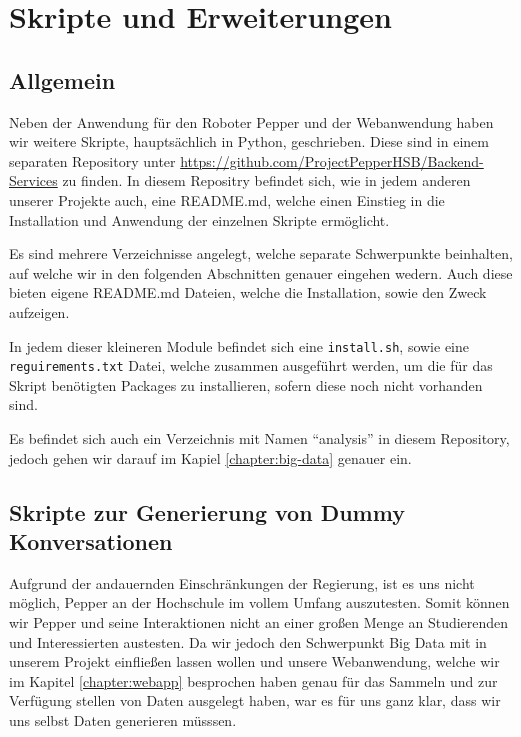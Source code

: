 \newcommand{\scripts}{Kapitel 6.}

\chapter{Skripte und Erweiterungen}
\label{chapter:scripts}
\lhead{\scripts \emph{Skripte und Erweiterungen}}

\section{Allgemein}
Neben der Anwendung für den Roboter Pepper und der Webanwendung haben wir weitere Skripte,
hauptsächlich in Python, geschrieben. Diese sind in einem separaten Repository unter
\href{https://github.com/ProjectPepperHSB/Backend-Services}{https://github.com/ProjectPepperHSB/Backend-Services}
zu finden. In diesem Repositry befindet sich, wie in jedem anderen unserer Projekte auch, eine README.md, welche
einen Einstieg in die Installation und Anwendung der einzelnen Skripte ermöglicht.

Es sind mehrere Verzeichnisse angelegt, welche separate Schwerpunkte beinhalten, auf welche wir in den folgenden
Abschnitten genauer eingehen wedern. Auch diese bieten eigene README.md Dateien, welche die Installation, sowie den Zweck aufzeigen.

In jedem dieser kleineren Module befindet sich eine \verb|install.sh|, sowie eine \verb|reguirements.txt| Datei, welche
zusammen ausgeführt werden, um die für das Skript benötigten Packages zu installieren, sofern diese noch nicht vorhanden sind.

Es befindet sich auch ein Verzeichnis mit Namen ``analysis'' in diesem Repository, jedoch gehen wir
darauf im Kapiel \ref{chapter:big-data} genauer ein.

\section{Skripte zur Generierung von Dummy Konversationen}
\label{sec:dummy-data}
Aufgrund der andauernden Einschränkungen der Regierung, ist es uns nicht möglich, Pepper an der Hochschule im vollem Umfang
auszutesten. Somit können wir Pepper und seine Interaktionen nicht an einer großen Menge an Studierenden und Interessierten austesten.
Da wir jedoch den Schwerpunkt Big Data mit in unserem Projekt einfließen lassen wollen und unsere Webanwendung, welche wir im Kapitel \ref{chapter:webapp}
besprochen haben genau für das Sammeln und zur Verfügung stellen von Daten ausgelegt haben, war es für uns ganz klar, dass
wir uns selbst Daten generieren müsssen.

